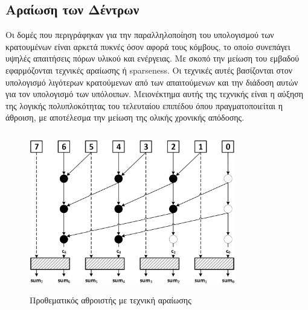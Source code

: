 \subsection{Αραίωση των Δέντρων}
\label{subsection:prefix_sparseness}
Οι δομές που περιγράφηκαν για την παραλληλοποίηση του υπολογισμού των κρατουμένων 
είναι αρκετά πυκνές όσον αφορά τους κόμβους, το οποίο συνεπάγει υψηλές απαιτήσεις πόρων υλικού και ενέργειας. Με σκοπό την μείωση του εμβαδού εφαρμόζονται τεχνικές αραίωσης ή sparseness. Οι τεχνικές αυτές βασίζονται στον υπολογισμό λιγότερων κρατούμενων από των απαιτούμενων και την διάδοση αυτών για τον υπολογισμό των υπόλοιπων. Μειονέκτημα αυτής της τεχνικής είναι η αύξηση της λογικής πολυπλοκότητας του τελευταίου επιπέδου όπου πραγματοποιείται η άθροιση, με αποτέλεσμα την μείωση της ολικής χρονικής απόδοσης.

\begin{figure}[H]
    \centering
    \includegraphics[height=7cm,width=9cm]{Pictures/prefix_sparse_2.png}
    \caption{Προθεματικός αθροιστής με τεχνική αραίωσης}
    \label{fig:prefix_sparse_2}
\end{figure}

